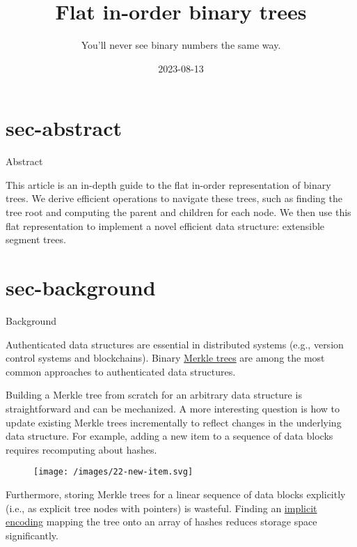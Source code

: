 \documentclass{article}
\title{Flat in-order binary trees}
\subtitle{You'll never see binary numbers the same way.}
\date{2023-08-13}
\begin{document}
\section{sec-abstract}{Abstract}

This article is an in-depth guide to the flat in-order representation of binary trees.
We derive efficient operations to navigate these trees, such as finding the tree root and computing the parent and children for each node.
We then use this flat representation to implement a novel efficient data structure: extensible segment trees.

\section{sec-background}{Background}

Authenticated data structures are essential in distributed systems (e.g., version control systems and blockchains).
Binary \href{https://en.wikipedia.org/wiki/Merkle_tree}{Merkle trees} are among the most common approaches to authenticated data structures.

Building a Merkle tree from scratch for an arbitrary data structure is straightforward and can be mechanized.
A more interesting question is how to update existing Merkle trees incrementally to reflect changes in the underlying data structure.
For example, adding a new item to a sequence of  data blocks requires recomputing about  hashes.

\begin{figure}[grayscale-diagram]
  \texttt{[image: /images/22-new-item.svg]}
\end{figure}

Furthermore, storing Merkle trees for a linear sequence of data blocks explicitly (i.e., as explicit tree nodes with pointers) is wasteful.
Finding an \href{https://en.wikipedia.org/wiki/Implicit_data_structure}{implicit encoding} mapping the tree onto an array of  hashes reduces storage space significantly.
\end{document}
